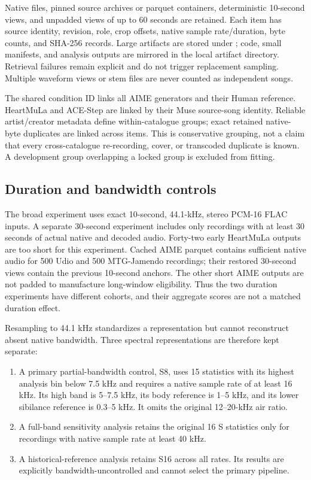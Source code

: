 Native files, pinned source archives or parquet containers, deterministic
10-second views, and unpadded views of up to 60 seconds are retained. Each item
has source identity, revision, role, crop offsets, native sample rate/duration,
byte counts, and SHA-256 records. Large artifacts are stored under
; code, small
manifests, and analysis outputs are mirrored in the local artifact directory.
Retrieval failures remain explicit and do not trigger replacement sampling.
Multiple waveform views or stem files are never counted as independent songs.

The shared condition ID links all AIME generators and their Human reference.
HeartMuLa and ACE-Step are linked by their Muse source-song identity. Reliable
artist/creator metadata define within-catalogue groups; exact retained native-byte
duplicates are linked across items. This is conservative grouping, not a claim
that every cross-catalogue re-recording, cover, or transcoded duplicate is known.
A development group overlapping a locked group is excluded from fitting.

\subsection{Duration and bandwidth controls}

The broad experiment uses exact 10-second, 44.1-kHz, stereo PCM-16 FLAC inputs.
A separate 30-second experiment includes only recordings with at least 30 seconds
of actual native and decoded audio. Forty-two early HeartMuLa outputs are too
short for this experiment. Cached AIME parquet contains sufficient native audio
for 500 Udio and 500 MTG-Jamendo recordings; their restored 30-second views contain
the previous 10-second anchors. The other short AIME outputs are not padded to
manufacture long-window eligibility. Thus the two duration experiments have
different cohorts, and their aggregate scores are not a matched duration effect.

Resampling to 44.1 kHz standardizes a representation but cannot reconstruct absent
native bandwidth. Three spectral representations are therefore kept separate:

\begin{enumerate}
\item A primary partial-bandwidth control, S8, uses 15 statistics with its highest
analysis bin below 7.5 kHz and requires a native sample rate of at least 16 kHz.
Its high band is 5--7.5 kHz, its body reference is 1--5 kHz, and its lower
sibilance reference is 0.3--5 kHz. It omits the original 12--20-kHz air ratio.
\item A full-band sensitivity analysis retains the original 16 S statistics only
for recordings with native sample rate at least 40 kHz.
\item A historical-reference analysis retains S16 across all rates. Its results
are explicitly bandwidth-uncontrolled and cannot select the primary pipeline.
\end{enumerate}

